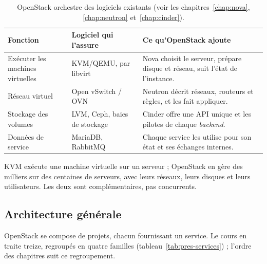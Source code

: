 \begin{table}[!ht]
\centering
\renewcommand{\arraystretch}{1.25}
\begin{tabular}{@{}>{\raggedright\arraybackslash}p{4.1cm}>{\raggedright\arraybackslash}p{5.0cm}>{\raggedright\arraybackslash}p{6.4cm}@{}}
\toprule
\textbf{Fonction} & \textbf{Logiciel qui l'assure} & \textbf{Ce qu'OpenStack ajoute} \\
\midrule
Exécuter les machines virtuelles & KVM/QEMU, par libvirt & Nova choisit le serveur, prépare disque et réseau, suit
  l'état de l'instance. \\
Réseau virtuel & Open vSwitch / OVN & Neutron décrit réseaux, routeurs et règles, et les fait appliquer. \\
Stockage des volumes & LVM, Ceph, baies de stockage & Cinder offre une API unique et les pilotes de chaque
  \emph{backend}. \\
Données de service & MariaDB, RabbitMQ & Chaque service les utilise pour son état et ses échanges internes. \\
\bottomrule
\end{tabular}
\caption{OpenStack orchestre des logiciels existants (voir les chapitres~\ref{chap:nova}, \ref{chap:neutron} et~\ref{chap:cinder}).}
\label{tab:pres-confie}
\end{table}

\begin{pointcle}
KVM exécute une machine virtuelle sur un serveur ; OpenStack en gère des milliers sur des centaines de serveurs, avec leurs réseaux,
leurs disques et leurs utilisateurs. Les deux sont complémentaires, pas concurrents.
\end{pointcle}

\subsection{Architecture générale}\label{sec:pres-architecture}

OpenStack se compose de projets, chacun fournissant un service. Le cours en traite treize, regroupés en quatre familles
(tableau~\ref{tab:pres-services}) ; l'ordre des chapitres suit ce regroupement.

